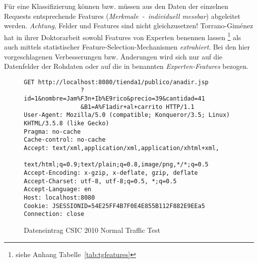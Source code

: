 Für eine Klassifizierung können bzw. müssen aus den Daten der einzelnen Requests entsprechende Features (\emph{Merkmale~-~individuell messbar}) abgeleitet werden. \emph{Achtung}, Felder und Features sind nicht gleichzusetzen! Torrano-Giménez hat in ihrer Doktorarbeit sowohl Features von Experten benennen lassen \footnote{siehe Anhang Tabelle~\ref{tab:tgfeatures}} als auch mittels statistischer Feature-Selection-Mechanismen \emph{extrahiert}. Bei den hier vorgeschlagenen Verbesserungen bzw. Änderungen wird sich nur auf die Datenfelder der Rohdaten oder auf die in \cite{Giménez2015} benannten \emph{Experten-Features} bezogen. 


\begin{figure}[h]
  \centering
        \caption{Dateneintrag CSIC 2010 Normal Traffic Test}
        \label{fig:ccex}
        \begin{lstlisting}[basicstyle=\footnotesize]
GET http://localhost:8080/tienda1/publico/anadir.jsp
                ?id=1&nombre=Jam%F3n+Ib%E9rico&precio=39&cantidad=41
                &B1=A%F1adir+al+carrito HTTP/1.1
User-Agent: Mozilla/5.0 (compatible; Konqueror/3.5; Linux) KHTML/3.5.8 (like Gecko)
Pragma: no-cache
Cache-control: no-cache
Accept: text/xml,application/xml,application/xhtml+xml,
                text/html;q=0.9;text/plain;q=0.8,image/png,*/*;q=0.5
Accept-Encoding: x-gzip, x-deflate, gzip, deflate
Accept-Charset: utf-8, utf-8;q=0.5, *;q=0.5
Accept-Language: en
Host: localhost:8080
Cookie: JSESSIONID=54E25FF4B7F0E4E855B112F882E9EEa5
Connection: close
\end{lstlisting}
\end{figure}

